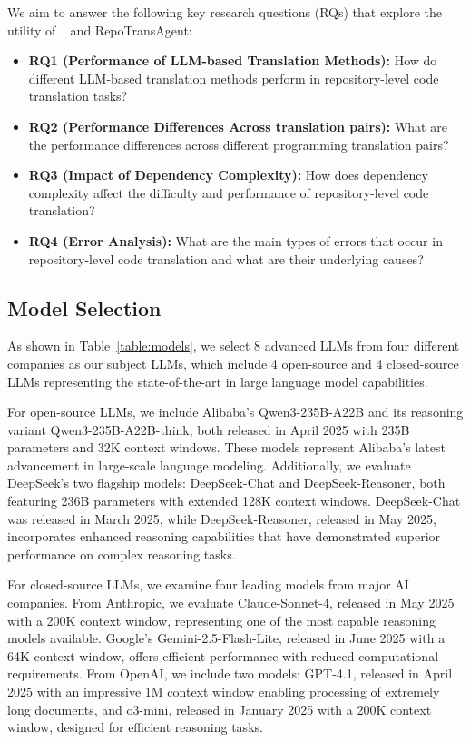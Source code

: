We aim to answer the following key research questions (RQs) that explore the utility of \toolname~ and RepoTransAgent:

\begin{itemize}[left=10pt]
    \item \textbf{RQ1 (Performance of LLM-based Translation Methods):} How do different LLM-based translation methods perform in repository-level code translation tasks?
    \item \textbf{RQ2 (Performance Differences Across translation pairs):} What are the performance differences across different programming translation pairs?
    \item \textbf{RQ3 (Impact of Dependency Complexity):} How does dependency complexity affect the difficulty and performance of repository-level code translation?
    \item \textbf{RQ4 (Error Analysis):} What are the main types of errors that occur in repository-level code translation and what are their underlying causes?
\end{itemize}



\subsection{Model Selection}
\label{sec:ModelSelection}
As shown in Table~\ref{table:models}, we select 8 advanced LLMs from four different companies as our subject LLMs, which include 4 open-source and 4 closed-source LLMs representing the state-of-the-art in large language model capabilities.

For open-source LLMs, we include Alibaba's Qwen3-235B-A22B and its reasoning variant Qwen3-235B-A22B-think, both released in April 2025 with 235B parameters and 32K context windows. These models represent Alibaba's latest advancement in large-scale language modeling. Additionally, we evaluate DeepSeek's two flagship models: DeepSeek-Chat and DeepSeek-Reasoner, both featuring 236B parameters with extended 128K context windows. DeepSeek-Chat was released in March 2025, while DeepSeek-Reasoner, released in May 2025, incorporates enhanced reasoning capabilities that have demonstrated superior performance on complex reasoning tasks.

For closed-source LLMs, we examine four leading models from major AI companies. From Anthropic, we evaluate Claude-Sonnet-4, released in May 2025 with a 200K context window, representing one of the most capable reasoning models available. Google's Gemini-2.5-Flash-Lite, released in June 2025 with a 64K context window, offers efficient performance with reduced computational requirements. From OpenAI, we include two models: GPT-4.1, released in April 2025 with an impressive 1M context window enabling processing of extremely long documents, and o3-mini, released in January 2025 with a 200K context window, designed for efficient reasoning tasks.


